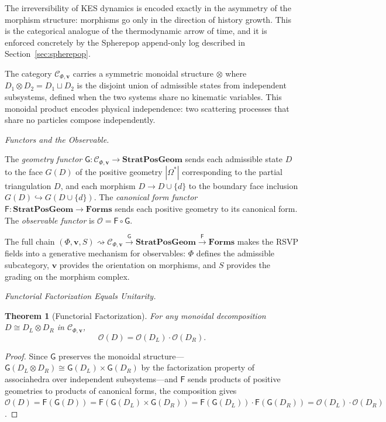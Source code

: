 \documentclass[12pt, oneside]{amsart}
\theoremstyle{plain}
\newtheorem{theorem}{Theorem}[section]
\theoremstyle{definition}
\theoremstyle{remark}
\newcommand{\Phif}{\Phi}
\newcommand{\Sf}{S}
\newcommand{\OmKS}{\Omega}
\newcommand{\SPG}{\mathbf{StratPosGeom}}
\newcommand{\Forms}{\mathbf{Forms}}
\newcommand{\Ccat}{\mathcal{C}_{\Phi,\mathbf{v}}}
\newcommand{\Gfun}{\mathsf{G}}
\newcommand{\Ffun}{\mathsf{F}}
\newcommand{\Ofun}{\mathcal{O}}
\begin{document}
The irreversibility of KES dynamics is encoded exactly in the asymmetry of the morphism structure: morphisms go only in the direction of history growth. This is the categorical analogue of the thermodynamic arrow of time, and it is enforced concretely by the Spherepop append-only log described in Section~\ref{sec:spherepop}.

The category $\Ccat$ carries a symmetric monoidal structure $\otimes$ where $D_1 \otimes D_2 = D_1 \sqcup D_2$ is the disjoint union of admissible states from independent subsystems, defined when the two systems share no kinematic variables. This monoidal product encodes physical independence: two scattering processes that share no particles compose independently.

\medskip\noindent\textit{Functors and the Observable.}

The \emph{geometry functor} $\Gfun: \Ccat \to \SPG$ sends each admissible state $D$ to the face $G(D)$ of the positive geometry $|\OmKS^*|$ corresponding to the partial triangulation $D$, and each morphism $D \to D \cup \{d\}$ to the boundary face inclusion $G(D) \hookrightarrow G(D \cup \{d\})$. The \emph{canonical form functor} $\Ffun: \SPG \to \Forms$ sends each positive geometry to its canonical form. The \emph{observable functor} is $\Ofun = \Ffun \circ \Gfun$.

The full chain $(\Phif, \mathbf{v}, \Sf) \rightsquigarrow \Ccat \xrightarrow{\Gfun} \SPG \xrightarrow{\Ffun} \Forms$ makes the RSVP fields into a generative mechanism for observables: $\Phif$ defines the admissible subcategory, $\mathbf{v}$ provides the orientation on morphisms, and $\Sf$ provides the grading on the morphism complex.

\medskip\noindent\textit{Functorial Factorization Equals Unitarity.}

\begin{theorem}[Functorial Factorization]
\label{thm:factorization}
For any monoidal decomposition $D \cong D_L \otimes D_R$ in $\Ccat$,
\[
  \Ofun(D) = \Ofun(D_L) \cdot \Ofun(D_R).
\]
\end{theorem}

\begin{proof}
Since $\Gfun$ preserves the monoidal structure---$\Gfun(D_L \otimes D_R) \cong \Gfun(D_L) \times \Gfun(D_R)$ by the factorization property of associahedra over independent subsystems---and $\Ffun$ sends products of positive geometries to products of canonical forms, the composition gives $\Ofun(D) = \Ffun(\Gfun(D)) = \Ffun(\Gfun(D_L) \times \Gfun(D_R)) = \Ffun(\Gfun(D_L)) \cdot \Ffun(\Gfun(D_R)) = \Ofun(D_L) \cdot \Ofun(D_R)$.
\end{proof}
\end{document}
